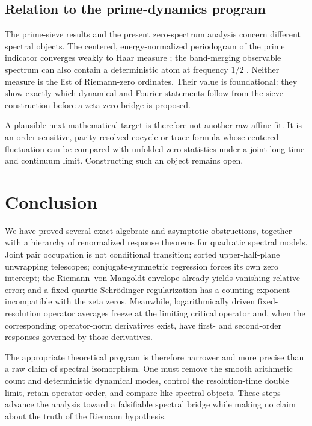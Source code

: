 \documentclass[11pt]{article}
\theoremstyle{definition}
\theoremstyle{remark}
\begin{document}
\subsection{Relation to the prime-dynamics program}

The prime-sieve results and the present zero-spectrum analysis concern different spectral objects.  The centered, energy-normalized periodogram of the prime indicator converges weakly to Haar measure \citep{WangPrimeSpectrum2026}; the band-merging observable spectrum can also contain a deterministic atom at frequency $1/2$ \citep{WangParity2026}.  Neither measure is the list of Riemann-zero ordinates.  Their value is foundational: they show exactly which dynamical and Fourier statements follow from the sieve construction before a zeta-zero bridge is proposed.

A plausible next mathematical target is therefore not another raw affine fit.  It is an order-sensitive, parity-resolved cocycle or trace formula whose centered fluctuation can be compared with unfolded zero statistics under a joint long-time and continuum limit.  Constructing such an object remains open.

\section{Conclusion}

We have proved several exact algebraic and asymptotic obstructions, together with a hierarchy of renormalized response theorems for quadratic spectral models.  Joint pair occupation is not conditional transition; sorted upper-half-plane unwrapping telescopes; conjugate-symmetric regression forces its own zero intercept; the Riemann--von Mangoldt envelope already yields vanishing relative error; and a fixed quartic Schr\"odinger regularization has a counting exponent incompatible with the zeta zeros.  Meanwhile, logarithmically driven fixed-resolution operator averages freeze at the limiting critical operator and, when the corresponding operator-norm derivatives exist, have first- and second-order responses governed by those derivatives.

The appropriate theoretical program is therefore narrower and more precise than a raw claim of spectral isomorphism.  One must remove the smooth arithmetic count and deterministic dynamical modes, control the resolution-time double limit, retain operator order, and compare like spectral objects.  These steps advance the analysis toward a falsifiable spectral bridge while making no claim about the truth of the Riemann hypothesis.
\end{document}
